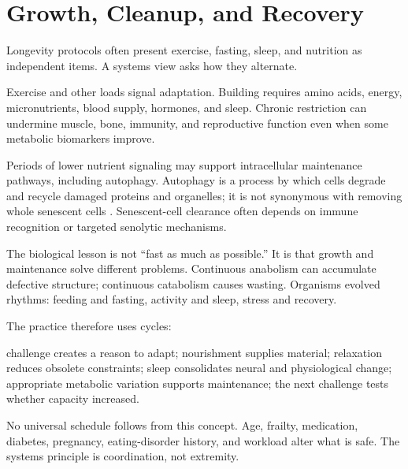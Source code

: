 \chapter{Growth, Cleanup, and Recovery}\label{chapter-17-growth-cleanup-and-recovery}

Longevity protocols often present exercise, fasting, sleep, and nutrition as independent items. A systems view asks how they alternate.

Exercise and other loads signal adaptation. Building requires amino acids, energy, micronutrients, blood supply, hormones, and sleep. Chronic restriction can undermine muscle, bone, immunity, and reproductive function even when some metabolic biomarkers improve.

Periods of lower nutrient signaling may support intracellular maintenance pathways, including autophagy. Autophagy is a process by which cells degrade and recycle damaged proteins and organelles; it is not synonymous with removing whole senescent cells \autocite{levine2019autophagy}. Senescent-cell clearance often depends on immune recognition or targeted senolytic mechanisms.

The biological lesson is not ``fast as much as possible.'' It is that growth and maintenance solve different problems. Continuous anabolism can accumulate defective structure; continuous catabolism causes wasting. Organisms evolved rhythms: feeding and fasting, activity and sleep, stress and recovery.

The practice therefore uses cycles:

challenge creates a reason to adapt; nourishment supplies material; relaxation reduces obsolete constraints; sleep consolidates neural and physiological change; appropriate metabolic variation supports maintenance; the next challenge tests whether capacity increased.

No universal schedule follows from this concept. Age, frailty, medication, diabetes, pregnancy, eating-disorder history, and workload alter what is safe. The systems principle is coordination, not extremity.
